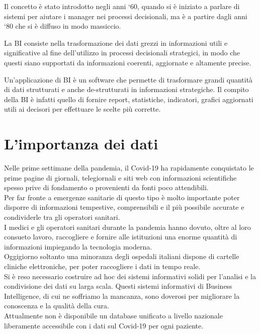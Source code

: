 Il concetto è stato introdotto negli anni ‘60, quando si è iniziato a parlare di sistemi per aiutare i manager nei processi decisionali, ma è a partire dagli anni ‘80 che si è diffuso in modo massiccio.
 
La BI consiste nella trasformazione dei dati grezzi in informazioni utili e significative al fine dell’utilizzo in processi decisionali strategici, in modo che questi siano supportati da informazioni coerenti, aggiornate e altamente precise.
 
Un'applicazione di BI è un software che permette di trasformare  grandi quantità di dati strutturati e anche de-strutturati in informazioni strategiche. Il compito della BI è infatti quello di fornire report, statistiche, indicatori, grafici aggiornati utili ai decisori per effettuare le scelte più corrette.
\pagebreak
\section{L'importanza dei dati}
Nelle prime settimane della pandemia, il Covid-19 ha rapidamente conquistato le prime pagine di giornali, telegiornali e siti web con informazioni scientifiche spesso prive di fondamento o provenienti da fonti poco attendibili.\\
Per far fronte a emergenze sanitarie di questo tipo è molto importante poter disporre di informazioni tempestive, comprensibili e il più possibile accurate e condividerle tra gli operatori sanitari.\\
I medici e gli operatori sanitari durante la pandemia hanno dovuto, oltre al loro consueto lavoro, raccogliere e fornire alle istituzioni una enorme quantità di informazioni impiegando la tecnologia moderna.\\
Oggigiorno soltanto una minoranza degli ospedali italiani dispone di cartelle cliniche elettroniche, per poter raccogliere i dati in tempo reale.\\
Si è reso necessario costruire ad hoc dei sistemi informativi solidi per l’analisi e la condivisione dei dati su larga scala.
Questi sistemi informativi di Business Intelligence, di cui ne soffriamo la mancanza, sono doverosi per migliorare la conoscenza e la qualità della cura.\\
Attualmente non è disponibile un database unificato a livello nazionale liberamente accessibile con i dati sul Covid-19 per ogni paziente.